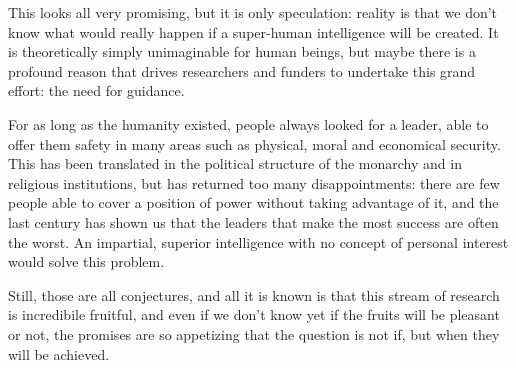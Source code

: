 This looks all very promising, but it is only speculation: reality is that we don't know what would really happen if a super-human intelligence will be created. It is theoretically simply unimaginable for human beings, but maybe there is a profound reason that drives researchers and funders to undertake this grand effort: the need for guidance.

For as long as the humanity existed, people always looked for a leader, able to offer them safety in many areas such as physical, moral and economical security. This has been translated in the political structure of the monarchy and in religious institutions, but has returned too many disappointments: there are few people able to cover a position of power without taking advantage of it, and the last century has shown us that the leaders that make the most success are often the worst.  An impartial, superior intelligence with no concept of personal interest would solve this problem.

Still, those are all conjectures, and all it is known is that this stream of research is incredibile fruitful, and even if we don't know yet if the fruits will be pleasant or not, the promises are so appetizing that the question is not if, but when they will be achieved. 




